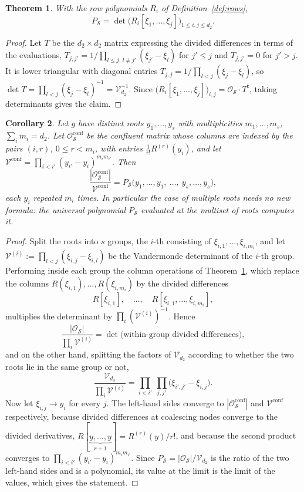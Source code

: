 \documentclass[11pt,reqno]{amsart}
\theoremstyle{plain}
\newtheorem{theorem}{Theorem}[section]
\newtheorem{corollary}[theorem]{Corollary}
\theoremstyle{definition}
\newcommand{\cO}{\mathcal{O}}
\newcommand{\cS}{\mathcal{S}}
\newcommand{\cV}{\mathcal{V}}
\begin{document}
\begin{theorem}\label{thm:newton}
With the row polynomials $R_i$ of Definition~\ref{def:rows},
\[
  P_\cS=\det\big(R_i[\xi_1,\dots,\xi_j]\big)_{1\le i,j\le d_2}.
\]
\end{theorem}

\begin{proof}
Let $T$ be the $d_2\times d_2$ matrix expressing the divided differences in terms
of the evaluations, $T_{j,j'}=1/\prod_{l\le j,\,l\ne j'}(\xi_{j'}-\xi_l)$ for
$j'\le j$ and $T_{j,j'}=0$ for $j'>j$. It is lower triangular with diagonal
entries $T_{j,j}=1/\prod_{l<j}(\xi_j-\xi_l)$, so
$\det T=\prod_{l<j}(\xi_j-\xi_l)^{-1}=\cV_{d_2}^{-1}$. Since
$\big(R_i[\xi_1,\dots,\xi_j]\big)_{i,j}=\cO_\cS\cdot T^{\mathsf t}$, taking
determinants gives the claim.
\end{proof}

\begin{corollary}\label{cor:conf}
Let $g$ have distinct roots $y_1,\dots,y_s$ with multiplicities $m_1,\dots,m_s$,
$\sum_i m_i=d_2$. Let $\cO^{\mathrm{conf}}_\cS$ be the confluent matrix whose
columns are indexed by the pairs $(i,r)$, $0\le r<m_i$, with entries
$\frac{1}{r!}R^{(r)}(y_i)$, and let
$\cV^{\mathrm{conf}}=\prod_{i<i'}(y_{i'}-y_i)^{m_im_{i'}}$. Then
\[
  \frac{|\cO^{\mathrm{conf}}_\cS|}{\cV^{\mathrm{conf}}}
  =P_\cS\big(y_1,\dots,y_1,\ \dots,\ y_s,\dots,y_s\big),
\]
each $y_i$ repeated $m_i$ times. In particular the case of multiple roots needs no
new formula: the universal polynomial $P_\cS$ evaluated at the multiset of roots
computes it.
\end{corollary}

\begin{proof}
Split the roots into $s$ groups, the $i$-th consisting of
$\xi_{i,1},\dots,\xi_{i,m_i}$, and let $\cV^{(i)}:=\prod_{l<j}(\xi_{i,j}-\xi_{i,l})$
be the Vandermonde determinant of the $i$-th group. Performing inside each group
the column operations of Theorem~\ref{thm:newton}, which replace the columns
$R(\xi_{i,1}),\dots,R(\xi_{i,m_i})$ by the divided differences
\[
  R[\xi_{i,1}],\quad \dots,\quad R[\xi_{i,1},\dots,\xi_{i,m_i}],
\]
multiplies the determinant by $\prod_i(\cV^{(i)})^{-1}$. Hence
\[
  \frac{|\cO_\cS|}{\prod_i \cV^{(i)}}
  =\det\Big(\text{within-group divided differences}\Big),
\]
and on the other hand, splitting the factors of $\cV_{d_2}$ according to whether
the two roots lie in the same group or not,
\[
  \frac{\cV_{d_2}}{\prod_i \cV^{(i)}}
  =\prod_{i<i'}\ \prod_{j,j'}\big(\xi_{i',j'}-\xi_{i,j}\big).
\]
Now let $\xi_{i,j}\to y_i$ for every $j$. The left-hand sides converge to
$|\cO^{\mathrm{conf}}_\cS|$ and $\cV^{\mathrm{conf}}$ respectively, because
divided differences at coalescing nodes converge to the divided derivatives,
$R[\underbrace{y,\dots,y}_{r+1}]=R^{(r)}(y)/r!$, and because the second product
converges to $\prod_{i<i'}(y_{i'}-y_i)^{m_im_{i'}}$. Since
$P_\cS=|\cO_\cS|/\cV_{d_2}$ is the ratio of the two left-hand sides and is a
polynomial, its value at the limit is the limit of the values, which gives the
statement.
\end{proof}
\end{document}
